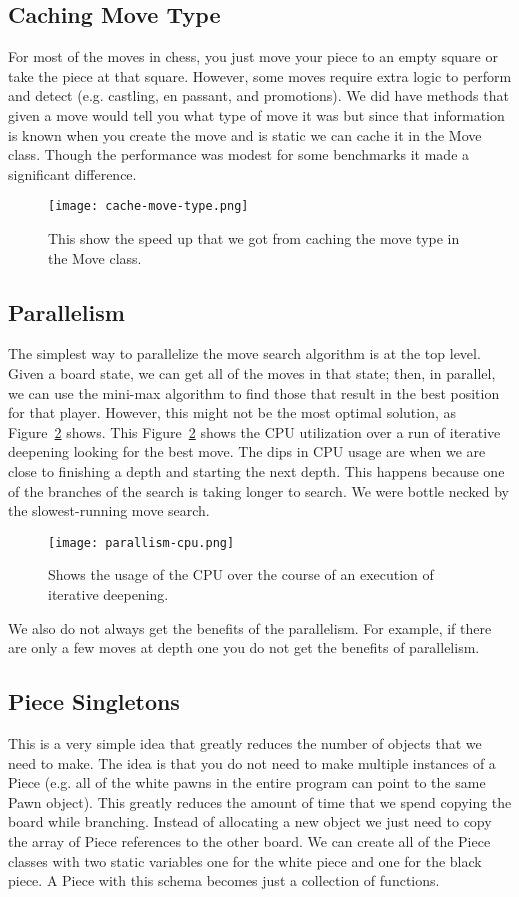 \documentclass[sigconf]{acmart}
\begin{document}
\subsection{Caching Move Type}
For most of the moves in chess, you just move your piece to an empty square or take the piece at that square.
However, some moves require extra logic to perform and detect (e.g. castling, en passant, and promotions).
We did have methods that given a move would tell you what type of move it was but since that information is known when you create the move and is static we can cache it in the Move class.
Though the performance was modest for some benchmarks it made a significant difference.
\begin{figure}[H]
    \centering
    \texttt{[image: cache-move-type.png]}
    \caption{This show the speed up that we got from caching the move type in the Move class.}
    \label{fig:enter-label}
\end{figure}

\subsection{Parallelism}
The simplest way to parallelize the move search algorithm is at the top level.
Given a board state, we can get all of the moves in that state; then, in parallel, we can use the mini-max algorithm to find those that result in the best position for that player.
However, this might not be the most optimal solution, as Figure~\ref{fig:cpu-trace} shows. This Figure~\ref{fig:cpu-trace} shows the CPU utilization over a run of iterative deepening looking for the best move.
The dips in CPU usage are when we are close to finishing a depth and starting the next depth.
This happens because one of the branches of the search is taking longer to search.
We were bottle necked by the slowest-running move search.
\begin{figure}[H]
    \centering
    \texttt{[image: parallism-cpu.png]}
    \caption{Shows the usage of the CPU over the course of an execution of iterative deepening.}
    \label{fig:cpu-trace}
\end{figure}
We also do not always get the benefits of the parallelism.
For example, if there are only a few moves at depth one you do not get the benefits of parallelism.

\subsection{Piece Singletons}
This is a very simple idea that greatly reduces the number of objects that we need to make.
The idea is that you do not need to make multiple instances of a Piece (e.g. all of the white pawns in the entire program can point to the same Pawn object).
This greatly reduces the amount of time that we spend copying the board while branching.
Instead of allocating a new object we just need to copy the array of Piece references to the other board.
We can create all of the Piece classes with two static variables one for the white piece and one for the black piece.
A Piece with this schema becomes just a collection of functions.
\end{document}
